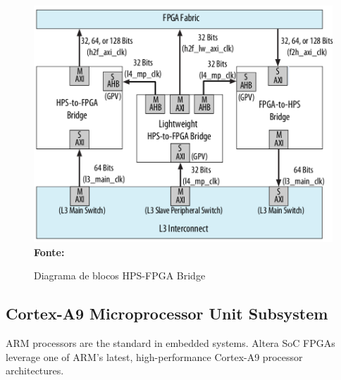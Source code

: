 \begin{figure}[ht]
	\caption{Diagrama de blocos HPS-FPGA Bridge}
	\begin{center}
		\includegraphics[scale=0.35]{imagens/hps-fpga_bridge.png}\\
		{\small \textbf{Fonte:} }
    \end{center}\label{fig:hpsfpgabridge}
\end{figure}







\subsection{Cortex-A9 Microprocessor Unit Subsystem}
ARM processors are the standard in embedded systems. Altera SoC FPGAs leverage one of ARM's latest, high-performance Cortex-A9 processor architectures.

